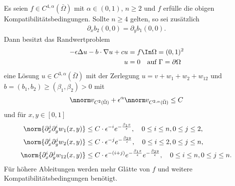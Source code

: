\begin{satz}\label{thm:7-1}
  Es seien $f \in C^{4, \alpha}(\bar \Omega)$ mit $\alpha \in (0, 1)$, $n \geq 2$ und $f$ erfülle die obigen Kompatibilitätsbedingungen. Sollte $n \geq 4$ gelten, so sei zusätzlich
  \begin{align*}
    \partial_{x} b_{2}(0, 0) =    \partial_{y} b_{1}(0, 0). 
  \end{align*}
Dann besitzt das Randwertproblem
\begin{align*}
  - \epsilon \Delta u - b \cdot \nabla u + cu &= f \In \Omega = (0, 1)^{2}\\
  u &= 0 \quad \text{auf } \Gamma = \partial \Omega
\end{align*}
eine Lösung $u \in C^{3, \alpha}(\bar \Omega)$ mit der Zerlegung $u = v + w_{1} + w_{2} + w_{12}$ und $b = (b_{1}, b_{2}) \geq (\beta_{1}, \beta_{2}) > 0$ mit
\begin{align*}
  \nnorm v _{C^{2}(\bar \Omega)} + \epsilon^{\alpha} \nnorm v_{C^{2, \alpha}(\bar \Omega)} \leq C
\end{align*}
und für $x, y \in [0, 1]$
\begin{align*}
  \norm{\partial_{x}^{j} \partial_{y}^{i} w_{1}(x, y)} &\leq C \cdot \epsilon^{-i} e^{- \frac {\beta_{1} x}{\epsilon}}, \quad 0 \leq i \leq n, 0 \leq j\leq 2, \\
  \norm{\partial_{x}^{i} \partial_{y}^{j} w_{2}(x, y)} &\leq C \cdot \epsilon^{-j} e^{- \frac {\beta_{2} y}{\epsilon}}, \quad 0 \leq i \leq 2, 0 \leq j\leq n, \\
  \norm{\partial_{x}^{i} \partial_{y}^{j} w_{12}(x, y)} &\leq C \cdot \epsilon^{-(i+j)} e^{- \frac {\beta_{1} x}{\epsilon}}e^{- \frac {\beta_{2} y}{\epsilon}}, \quad 0 \leq i \leq n, 0 \leq j\leq n. 
\end{align*}
Für höhere Ableitungen werden mehr Glätte von $f$ und weitere Kompatibilitätsbedingungen benötigt.
\end{satz}
